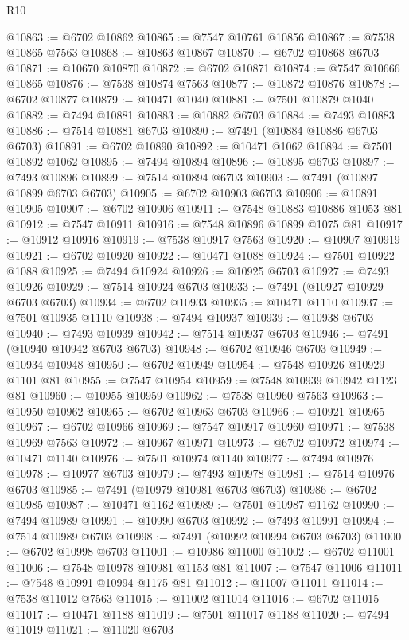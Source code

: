 \begin{lexlean}{R10}
\begin{coremodule}
{{{{{{{{{{{{{{{{{{{{{{{{{{{{{{{{{{{{{{{{{{{{{{{{{{{{{{{{{{{{{{{{{{{{{{{{{{{{{{{{{{{{@10863 := @6702 @10862
@10865 := @7547 @10761 @10856
@10867 := @7538 @10865 @7563
@10868 := @10863 @10867
@10870 := @6702 @10868 @6703
@10871 := @10670 @10870
@10872 := @6702 @10871
@10874 := @7547 @10666 @10865
@10876 := @7538 @10874 @7563
@10877 := @10872 @10876
@10878 := @6702 @10877
@10879 := @10471 @1040
@10881 := @7501 @10879 @1040
@10882 := @7494 @10881
@10883 := @10882 @6703
@10884 := @7493 @10883
@10886 := @7514 @10881 @6703
@10890 := @7491 (@10884 @10886 @6703 @6703)
@10891 := @6702 @10890
@10892 := @10471 @1062
@10894 := @7501 @10892 @1062
@10895 := @7494 @10894
@10896 := @10895 @6703
@10897 := @7493 @10896
@10899 := @7514 @10894 @6703
@10903 := @7491 (@10897 @10899 @6703 @6703)
@10905 := @6702 @10903 @6703
@10906 := @10891 @10905
@10907 := @6702 @10906
@10911 := @7548 @10883 @10886 @1053 @81
@10912 := @7547 @10911
@10916 := @7548 @10896 @10899 @1075 @81
@10917 := @10912 @10916
@10919 := @7538 @10917 @7563
@10920 := @10907 @10919
@10921 := @6702 @10920
@10922 := @10471 @1088
@10924 := @7501 @10922 @1088
@10925 := @7494 @10924
@10926 := @10925 @6703
@10927 := @7493 @10926
@10929 := @7514 @10924 @6703
@10933 := @7491 (@10927 @10929 @6703 @6703)
@10934 := @6702 @10933
@10935 := @10471 @1110
@10937 := @7501 @10935 @1110
@10938 := @7494 @10937
@10939 := @10938 @6703
@10940 := @7493 @10939
@10942 := @7514 @10937 @6703
@10946 := @7491 (@10940 @10942 @6703 @6703)
@10948 := @6702 @10946 @6703
@10949 := @10934 @10948
@10950 := @6702 @10949
@10954 := @7548 @10926 @10929 @1101 @81
@10955 := @7547 @10954
@10959 := @7548 @10939 @10942 @1123 @81
@10960 := @10955 @10959
@10962 := @7538 @10960 @7563
@10963 := @10950 @10962
@10965 := @6702 @10963 @6703
@10966 := @10921 @10965
@10967 := @6702 @10966
@10969 := @7547 @10917 @10960
@10971 := @7538 @10969 @7563
@10972 := @10967 @10971
@10973 := @6702 @10972
@10974 := @10471 @1140
@10976 := @7501 @10974 @1140
@10977 := @7494 @10976
@10978 := @10977 @6703
@10979 := @7493 @10978
@10981 := @7514 @10976 @6703
@10985 := @7491 (@10979 @10981 @6703 @6703)
@10986 := @6702 @10985
@10987 := @10471 @1162
@10989 := @7501 @10987 @1162
@10990 := @7494 @10989
@10991 := @10990 @6703
@10992 := @7493 @10991
@10994 := @7514 @10989 @6703
@10998 := @7491 (@10992 @10994 @6703 @6703)
@11000 := @6702 @10998 @6703
@11001 := @10986 @11000
@11002 := @6702 @11001
@11006 := @7548 @10978 @10981 @1153 @81
@11007 := @7547 @11006
@11011 := @7548 @10991 @10994 @1175 @81
@11012 := @11007 @11011
@11014 := @7538 @11012 @7563
@11015 := @11002 @11014
@11016 := @6702 @11015
@11017 := @10471 @1188
@11019 := @7501 @11017 @1188
@11020 := @7494 @11019
@11021 := @11020 @6703
}}}}}}}}}}}}}}}}}}}}}}}}}}}}}}}}}}}}}}}}}}}}}}}}}}}}}}}}}}}}}}}}}}}}}}}}}}}}}}}}}}}}
\end{coremodule}
\end{lexlean}
